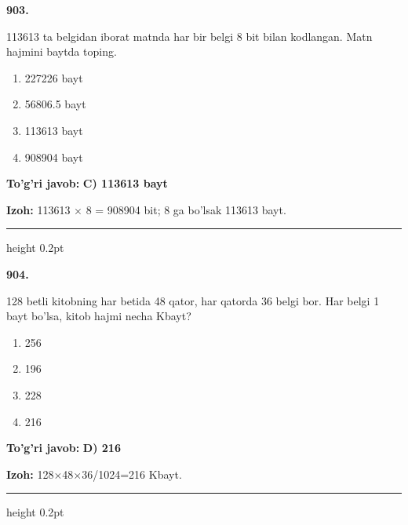 \documentclass[10pt,a4paper,oneside]{article}
\begin{document}
\noindent\textbf{\color{ink}903.}
\par
113613 ta belgidan iborat matnda har bir belgi 8 bit bilan kodlangan. Matn hajmini baytda toping.
\begin{enumerate}[label=\Alph*),leftmargin=9mm]
\item 227226 bayt
\item 56806.5 bayt
\item 113613 bayt
\item 908904 bayt
\end{enumerate}
\begin{tcolorbox}[enhanced,breakable,colback=teal!4,colframe=teal!50!black,boxrule=0.5pt,arc=1.1mm,left=3mm,right=3mm,top=1.7mm,bottom=1.7mm,before skip=2mm,after skip=2mm]
\textbf{\color{teal}To'g'ri javob:} \textbf{C) 113613 bayt}
\par\smallskip
\textbf{Izoh:} 113613 \ensuremath{\times} 8 = 908904 bit; 8 ga bo'lsak 113613 bayt.
\end{tcolorbox}
\vspace{2mm}\hrule height 0.2pt \vspace{3mm}

\noindent\textbf{\color{ink}904.}
\par
128 betli kitobning har betida 48 qator, har qatorda 36 belgi bor. Har belgi 1 bayt bo'lsa, kitob hajmi necha Kbayt?
\begin{enumerate}[label=\Alph*),leftmargin=9mm]
\item 256
\item 196
\item 228
\item 216
\end{enumerate}
\begin{tcolorbox}[enhanced,breakable,colback=teal!4,colframe=teal!50!black,boxrule=0.5pt,arc=1.1mm,left=3mm,right=3mm,top=1.7mm,bottom=1.7mm,before skip=2mm,after skip=2mm]
\textbf{\color{teal}To'g'ri javob:} \textbf{D) 216}
\par\smallskip
\textbf{Izoh:} 128\ensuremath{\times}48\ensuremath{\times}36/1024=216 Kbayt.
\end{tcolorbox}
\vspace{2mm}\hrule height 0.2pt \vspace{3mm}
\end{document}
